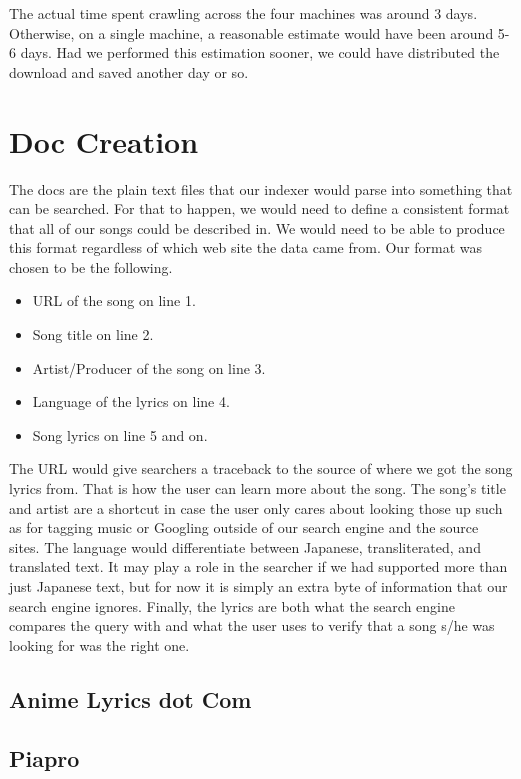 \documentclass{acm} %
\begin{document}
\begin{CJK}{UTF8}{zhsong}
The actual time spent crawling across the four machines was around 3 days. Otherwise, on a single machine, a reasonable estimate would have been around 5-6 days. Had we performed this estimation sooner, we could have distributed the download and saved another day or so.

\section{Doc Creation}

The docs are the plain text files that our indexer would parse into something that can be searched. For that to happen, we would need to define a consistent format that all of our songs could be described in. We would need to be able to produce this format regardless of which web site the data came from. Our format was chosen to be the following.

\begin{itemize}
\item URL of the song on line 1.
\item Song title on line 2.
\item Artist/Producer of the song on line 3.
\item Language of the lyrics on line 4.
\item Song lyrics on line 5 and on.
\end{itemize}

The URL would give searchers a traceback to the source of where we got the song lyrics from. That is how the user can learn more about the song. The song's title and artist are a shortcut in case the user only cares about looking those up such as for tagging music or Googling outside of our search engine and the source sites. The language would differentiate between Japanese, transliterated, and translated text. It may play a role in the searcher if we had supported more than just Japanese text, but for now it is simply an extra byte of information that our search engine ignores. Finally, the lyrics are both what the search engine compares the query with and what the user uses to verify that a song s/he was looking for was the right one.

\subsection{Anime Lyrics dot Com}

\subsection{Piapro}


\end{CJK}
\end{document}
